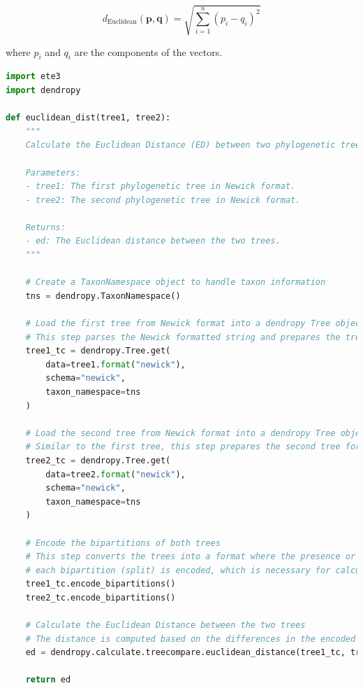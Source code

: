 \begin{equation}\label{eq:euclidean}
    d_{\text{Euclidean}}(\mathbf{p}, \mathbf{q}) = \sqrt{\sum_{i=1}^{n} (p_i - q_i)^2}
\end{equation}

where $p_i$ and $q_i$ are the components of the vectors.

\begin{lstlisting}[label=lst:euclideanDist,language=Python,caption=Python script for calculating the ED using the ete3 and the dendropy packages in the aPhyloGeo package]
import ete3
import dendropy

def euclidean_dist(tree1, tree2):
    """
    Calculate the Euclidean Distance (ED) between two phylogenetic trees.

    Parameters:
    - tree1: The first phylogenetic tree in Newick format.
    - tree2: The second phylogenetic tree in Newick format.

    Returns:
    - ed: The Euclidean distance between the two trees.
    """
    
    # Create a TaxonNamespace object to handle taxon information
    tns = dendropy.TaxonNamespace()

    # Load the first tree from Newick format into a dendropy Tree object
    # This step parses the Newick formatted string and prepares the tree for comparison.
    tree1_tc = dendropy.Tree.get(
        data=tree1.format("newick"), 
        schema="newick", 
        taxon_namespace=tns
    )
    
    # Load the second tree from Newick format into a dendropy Tree object
    # Similar to the first tree, this step prepares the second tree for comparison.
    tree2_tc = dendropy.Tree.get(
        data=tree2.format("newick"), 
        schema="newick", 
        taxon_namespace=tns
    )

    # Encode the bipartitions of both trees
    # This step converts the trees into a format where the presence or absence of 
    # each bipartition (split) is encoded, which is necessary for calculating distances.
    tree1_tc.encode_bipartitions()
    tree2_tc.encode_bipartitions()

    # Calculate the Euclidean Distance between the two trees
    # The distance is computed based on the differences in the encoded bipartitions.
    ed = dendropy.calculate.treecompare.euclidean_distance(tree1_tc, tree2_tc)

    return ed
\end{lstlisting}

